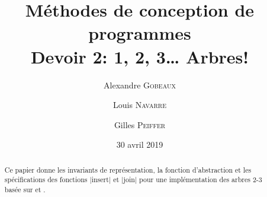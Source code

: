 \documentclass{elsarticle}
\begin{document}
\title{Méthodes de conception de programmes \\ Devoir 2: 1, 2, 3\ldots{} Arbres!}
\date{30 avril 2019}

\address[add1]{École Polytechnique, Université catholique de Louvain, Place de l'Université 1, 1348 Ottignies-Louvain-la-Neuve, Belgique}

\author[add1]{Alexandre \textsc{Gobeaux}}

\author[add1]{Louis \textsc{Navarre}}

\author[add1]{Gilles \textsc{Peiffer}}

\begin{abstract}
Ce papier donne les invariants de représentation, la fonction d'abstraction et les spécifications des fonctions \inlinedafny|insert| et \inlinedafny|join| pour une implémentation des arbres 2-3 basée sur \cite{algs4th} et \cite{wiki:23tree}.
\end{abstract}
\maketitle
\end{document}
